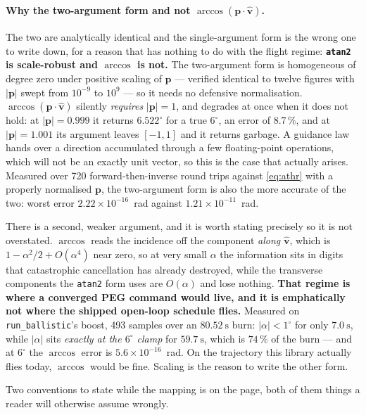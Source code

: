 \documentclass[11pt]{article}
\newcommand{\vhat}{\hat{\mathbf{v}}}
\newcommand{\code}[1]{\texttt{#1}}
\begin{document}
\paragraph{Why the two-argument form and not $\arccos(\mathbf{p}\cdot\vhat)$.}
The two are analytically identical and the single-argument form is the wrong
one to write down, for a reason that has nothing to do with the flight regime:
\textbf{\code{atan2} is scale-robust and $\arccos$ is not.} The two-argument
form is homogeneous of degree zero under positive scaling of $\mathbf{p}$ ---
verified identical to twelve figures with $|\mathbf{p}|$ swept from $10^{-9}$
to $10^{9}$ --- so it needs no defensive normalisation. $\arccos(\mathbf{p}
\cdot\vhat)$ silently \emph{requires} $|\mathbf{p}| = 1$, and degrades at once
when it does not hold: at $|\mathbf{p}| = 0.999$ it returns $6.522^{\circ}$ for
a true $6^{\circ}$, an error of $8.7\,\%$, and at $|\mathbf{p}| = 1.001$ its
argument leaves $[-1,1]$ and it returns garbage. A guidance law hands over a
direction accumulated through a few floating-point operations, which will not
be an exactly unit vector, so this is the case that actually arises. Measured
over 720 forward-then-inverse round trips against \eqref{eq:athr} with a
properly normalised $\mathbf{p}$, the two-argument form is also the more
accurate of the two: worst error $2.22\times10^{-16}$~rad against
$1.21\times10^{-11}$~rad.

There is a second, weaker argument, and it is worth stating precisely so it is
not overstated. $\arccos$ reads the incidence off the component \emph{along}
$\vhat$, which is $1 - \alpha^2/2 + O(\alpha^4)$ near zero, so at very small
$\alpha$ the information sits in digits that catastrophic cancellation has
already destroyed, while the transverse components the \code{atan2} form uses
are $O(\alpha)$ and lose nothing. \textbf{That regime is where a converged PEG
command would live, and it is emphatically not where the shipped open-loop
schedule flies.} Measured on \code{run\_ballistic}'s boost, 493 samples over
an $80.52~\mathrm{s}$ burn: $|\alpha| < 1^{\circ}$ for only $7.0~\mathrm{s}$,
while $|\alpha|$ sits \emph{exactly at the $6^{\circ}$ clamp} for
$59.7~\mathrm{s}$, which is $74\,\%$ of the burn --- and at $6^{\circ}$ the
$\arccos$ error is $5.6\times10^{-16}$~rad. On the trajectory this library
actually flies today, $\arccos$ would be fine. Scaling is the reason to write
the other form.

Two conventions to state while the mapping is on the page, both of them things
a reader will otherwise assume wrongly.
\end{document}
